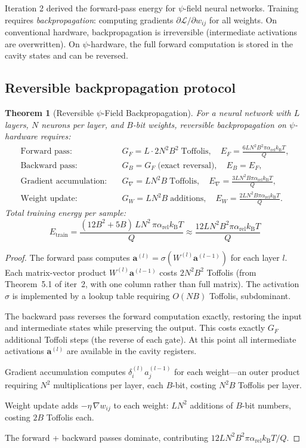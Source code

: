 \documentclass[11pt]{article}
\newtheorem{theorem}{Theorem}[section]
\theoremstyle{definition}
\theoremstyle{remark}
\newcommand{\kB}{k_{\mathrm{B}}}
\newcommand{\arel}{\alpha_{\mathrm{rel}}}
\begin{document}
Iteration 2 derived the forward-pass energy for $\psi$-field neural
networks. Training requires \emph{backpropagation}: computing gradients
$\partial\mathcal{L}/\partial w_{ij}$ for all weights. On conventional
hardware, backpropagation is irreversible (intermediate activations
are overwritten). On $\psi$-hardware, the full forward computation is
stored in the cavity states and can be reversed.

\subsection{Reversible backpropagation protocol}

\begin{theorem}[Reversible $\psi$-Field Backpropagation]
\label{thm:backprop}
For a neural network with $L$ layers, $N$ neurons per layer, and
$B$-bit weights, reversible backpropagation on $\psi$-hardware requires:
\begin{align}
\text{Forward pass:}&\quad G_F = L\cdot 2N^2 B^2\;\text{Toffolis},
\quad E_F = \frac{6LN^2B^2\pi\arel\kB T}{Q}, \\
\text{Backward pass:}&\quad G_B = G_F\;\text{(exact reversal)},
\quad E_B = E_F, \\
\text{Gradient accumulation:}&\quad G_\nabla = L N^2 B\;\text{Toffolis},
\quad E_\nabla = \frac{3LN^2 B\pi\arel\kB T}{Q}, \\
\text{Weight update:}&\quad G_W = LN^2 B\;\text{additions},
\quad E_W = \frac{2LN^2 B\pi\arel\kB T}{Q}.
\end{align}
Total training energy per sample:
\begin{equation}
\boxed{
E_{\mathrm{train}} = \frac{(12B^2 + 5B)\,L N^2\,\pi\arel\kB T}{Q}
\approx \frac{12LN^2 B^2\pi\arel\kB T}{Q}
}
\label{eq:train-energy}
\end{equation}
\end{theorem}

\begin{proof}
The forward pass computes $\mathbf{a}^{(l)} = \sigma(W^{(l)}\mathbf{a}^{(l-1)})$
for each layer $l$. Each matrix-vector product $W^{(l)}\mathbf{a}^{(l-1)}$
costs $2N^2 B^2$ Toffolis (from Theorem~5.1 of iter~2, with one column
rather than full matrix). The activation $\sigma$ is implemented by a
lookup table requiring $O(NB)$ Toffolis, subdominant.

The backward pass reverses the forward computation exactly, restoring
the input and intermediate states while preserving the output. This
costs exactly $G_F$ additional Toffoli steps (the reverse of each gate).
At this point all intermediate activations $\mathbf{a}^{(l)}$ are
available in the cavity registers.

Gradient accumulation computes $\delta^{(l)}_i a^{(l-1)}_j$ for each
weight---an outer product requiring $N^2$ multiplications per layer,
each $B$-bit, costing $N^2 B$ Toffolis per layer.

Weight update adds $-\eta\,\nabla w_{ij}$ to each weight: $LN^2$
additions of $B$-bit numbers, costing $2B$ Toffolis each.

The forward + backward passes dominate, contributing $12LN^2 B^2\pi\arel\kB T/Q$.
\end{proof}
\end{document}
